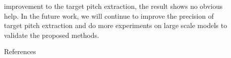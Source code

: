 \documentclass[final]{beamer}
\newlength{\sepwidth}
\newlength{\colwidth}
\newcommand{\separatorcolumn}{\begin{column}{\sepwidth}\end{column}}
\begin{document}
\begin{frame}[t]
\begin{columns}[t]
            \separatorcolumn

            \begin{column}{\colwidth}
                \begin{block}{}
                    improvement to the target pitch extraction, the result shows no obvious help. In the future work, we will continue to improve the precision of target pitch extraction and do more experiments on large scale models to validate the proposed methods.
                \end{block}
                \begin{block}{References}

                    \footnotesize{}

                \end{block}
            \end{column}

            \separatorcolumn
        \end{columns}
    \end{frame}
\end{document}
